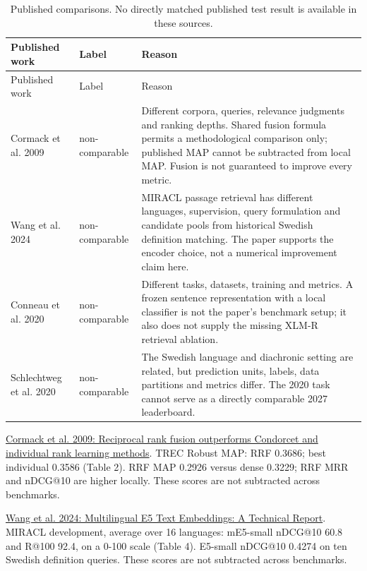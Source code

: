 {\small
\setlength{\tabcolsep}{3pt}
\begin{longtable}{>{\raggedright\arraybackslash}p{}>{\raggedright\arraybackslash}p{}>{\raggedright\arraybackslash}p{}}
\caption{Published comparisons. No directly matched published test result is available in these sources.}\\
\toprule
Published work & Label & Reason \\
\midrule
\endfirsthead
Published work & Label & Reason \\
\midrule
\endhead
Cormack et al. 2009 & non-comparable & Different corpora, queries, relevance judgments and ranking depths. Shared fusion formula permits a methodological comparison only; published MAP cannot be subtracted from local MAP. Fusion is not guaranteed to improve every metric. \\
Wang et al. 2024 & non-comparable & MIRACL passage retrieval has different languages, supervision, query formulation and candidate pools from historical Swedish definition matching. The paper supports the encoder choice, not a numerical improvement claim here. \\
Conneau et al. 2020 & non-comparable & Different tasks, datasets, training and metrics. A frozen sentence representation with a local classifier is not the paper's benchmark setup; it also does not supply the missing XLM-R retrieval ablation. \\
Schlechtweg et al. 2020 & non-comparable & The Swedish language and diachronic setting are related, but prediction units, labels, data partitions and metrics differ. The 2020 task cannot serve as a directly comparable 2027 leaderboard. \\
\bottomrule
\end{longtable}
}

\href{https://cormack.uwaterloo.ca/cormack/cormacksigir09-rrf.pdf}{Cormack et al. 2009: Reciprocal rank fusion outperforms Condorcet and individual rank learning methods}. TREC Robust MAP: RRF 0.3686; best individual 0.3586 (Table 2). RRF MAP 0.2926 versus dense 0.3229; RRF MRR and nDCG@10 are higher locally. These scores are not subtracted across benchmarks.

\href{https://arxiv.org/html/2402.05672v1}{Wang et al. 2024: Multilingual E5 Text Embeddings: A Technical Report}. MIRACL development, average over 16 languages: mE5-small nDCG@10 60.8 and R@100 92.4, on a 0-100 scale (Table 4). E5-small nDCG@10 0.4274 on ten Swedish definition queries. These scores are not subtracted across benchmarks.

